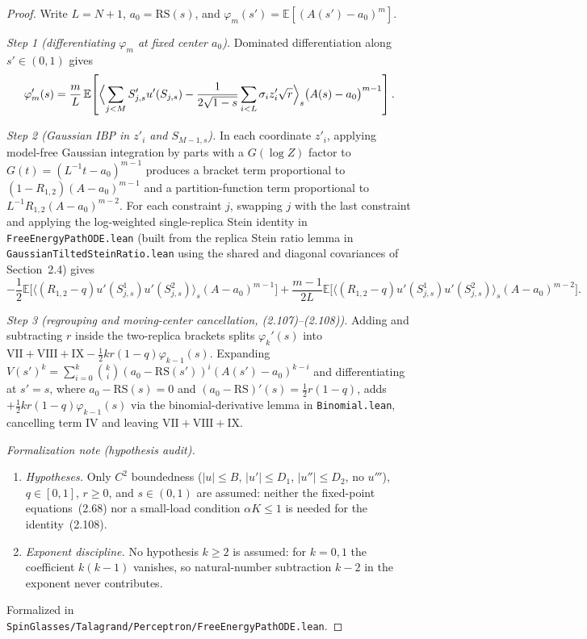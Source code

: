 \begin{proof}
  \leanok
Write $L=N+1$, $a_0=\mathrm{RS}(s)$, and $\varphi_m(s')=\mathbb E[(A(s')-a_0)^m]$.

\emph{Step 1 (differentiating $\varphi_m$ at fixed center $a_0$).} Dominated differentiation along
$s'\in(0,1)$ gives
\[
 \varphi_m'(s)=\frac{m}{L}\,\mathbb E\!\left[\Bigl\langle\sum_{j<M}S'_{j,s}u'(S_{j,s})
   -\frac{1}{2\sqrt{1-s}}\sum_{i<L}\sigma_i z'_i\sqrt r\Bigr\rangle_s\bigl(A(s)-a_0\bigr)^{m-1}\right].
\]

\emph{Step 2 (Gaussian IBP in $z'_i$ and $S_{M-1,s}$).} In each coordinate $z'_i$, applying model-free
Gaussian integration by parts with a $G(\log Z)$ factor to $G(t)=(L^{-1}t-a_0)^{m-1}$ produces a bracket
term proportional to $(1-R_{1,2})(A-a_0)^{m-1}$ and a partition-function term proportional to
$L^{-1}R_{1,2}(A-a_0)^{m-2}$. For each constraint $j$, swapping $j$ with the last constraint and applying
the log-weighted single-replica Stein identity in \texttt{FreeEnergyPathODE.lean} (built from the replica
Stein ratio lemma in \texttt{GaussianTiltedSteinRatio.lean} using the shared and diagonal covariances of
Section~2.4) gives
\[
 -\frac12\mathbb E\bigl[\langle(R_{1,2}-q)u'(S^1_{j,s})u'(S^2_{j,s})\rangle_s(A-a_0)^{m-1}\bigr]
 +\frac{m-1}{2L}\mathbb E\bigl[\langle(R_{1,2}-q)u'(S^1_{j,s})u'(S^2_{j,s})\rangle_s(A-a_0)^{m-2}\bigr].
\]

\emph{Step 3 (regrouping and moving-center cancellation, (2.107)--(2.108)).} Adding and subtracting $r$ inside the
two-replica brackets splits $\varphi_k'(s)$ into $\mathrm{VII}+\mathrm{VIII}+\mathrm{IX}-\frac12kr(1-q)\varphi_{k-1}(s)$.
Expanding $V(s')^k=\sum_{i=0}^k\binom{k}{i}(a_0-\mathrm{RS}(s'))^i(A(s')-a_0)^{k-i}$ and differentiating at
$s'=s$, where $a_0-\mathrm{RS}(s)=0$ and $(a_0-\mathrm{RS})'(s)=\frac12r(1-q)$, adds $+\frac12kr(1-q)\varphi_{k-1}(s)$
via the binomial-derivative lemma in \texttt{Binomial.lean}, cancelling term IV and leaving
$\mathrm{VII}+\mathrm{VIII}+\mathrm{IX}$.

\emph{Formalization note (hypothesis audit).}
\begin{enumerate}
\item \emph{Hypotheses.} Only $C^2$ boundedness ($|u|\le B$, $|u'|\le D_1$, $|u''|\le D_2$, no $u'''$),
$q\in[0,1]$, $r\ge 0$, and $s\in(0,1)$ are assumed: neither the fixed-point equations~(2.68) nor a small-load
condition $\alpha K\le 1$ is needed for the identity~(2.108).
\item \emph{Exponent discipline.} No hypothesis $k\ge 2$ is assumed: for $k=0,1$ the coefficient $k(k-1)$ vanishes,
so natural-number subtraction $k-2$ in the exponent never contributes.
\end{enumerate}
Formalized in \texttt{SpinGlasses/Talagrand/Perceptron/FreeEnergyPathODE.lean}.
\end{proof}


